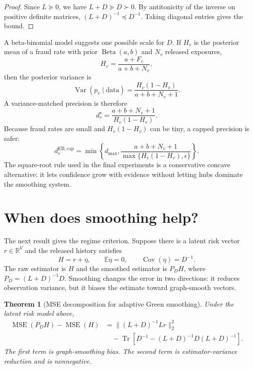 \documentclass[11pt]{article}
\newtheorem{theorem}{Theorem}[section]
\theoremstyle{definition}
\theoremstyle{remark}
\newcommand{\R}{\mathbb{R}}
\newcommand{\E}{\mathbb{E}}
\newcommand{\Var}{\operatorname{Var}}
\newcommand{\Cov}{\operatorname{Cov}}
\newcommand{\Tr}{\operatorname{Tr}}
\begin{document}
\begin{proof}
Since $L\succeq0$, we have $L+D\succeq D\succ0$. By antitonicity of the inverse on positive definite matrices, $(L+D)^{-1}\preceq D^{-1}$. Taking diagonal entries gives the bound.
\end{proof}

A beta-binomial model suggests one possible scale for $D$. If $H_v$ is the posterior mean of a fraud rate with prior $\operatorname{Beta}(a,b)$ and $N_v$ released exposures,
\[
    H_v=\frac{a+F_v}{a+b+N_v},
\]
then the posterior variance is
\[
    \Var(p_v\mid\text{data})=\frac{H_v(1-H_v)}{a+b+N_v+1}.
\]
A variance-matched precision is therefore
\begin{equation}
    d_v^\star=\frac{a+b+N_v+1}{H_v(1-H_v)}.
    \label{eq:eb-d}
\end{equation}
Because fraud rates are small and $H_v(1-H_v)$ can be tiny, a capped precision is safer:
\begin{equation}
    d_v^{\mathrm{EB,cap}}=\min\left\{d_{\max},\frac{a+b+N_v+1}{\max\{H_v(1-H_v),\epsilon\}}\right\}.
    \label{eq:eb-cap}
\end{equation}
The square-root rule used in the final experiments is a conservative concave alternative: it lets confidence grow with evidence without letting hubs dominate the smoothing system.

\section{When does smoothing help?}
\label{sec:mse}

The next result gives the regime criterion. Suppose there is a latent risk vector $r\in\R^V$ and the released history satisfies
\[
    H=r+\eta,
    \qquad
    \E\eta=0,
    \qquad
    \Cov(\eta)=D^{-1}.
\]
The raw estimator is $H$ and the smoothed estimator is $P_DH$, where $P_D=(L+D)^{-1}D$. Smoothing changes the error in two directions: it reduces observation variance, but it biases the estimate toward graph-smooth vectors.

\begin{theorem}[MSE decomposition for adaptive Green smoothing]
\label{thm:mse-decomp}
Under the latent risk model above,
\begin{equation}
\begin{aligned}
    \operatorname{MSE}(P_DH)-\operatorname{MSE}(H)
    & = \|(L+D)^{-1}Lr\|_2^2 \\
    &\quad - \Tr\left[D^{-1}-(L+D)^{-1}D(L+D)^{-1}\right].
\end{aligned}
\label{eq:mse-decomp}
\end{equation}
The first term is graph-smoothing bias. The second term is estimator-variance reduction and is nonnegative.
\end{theorem}
\end{document}
